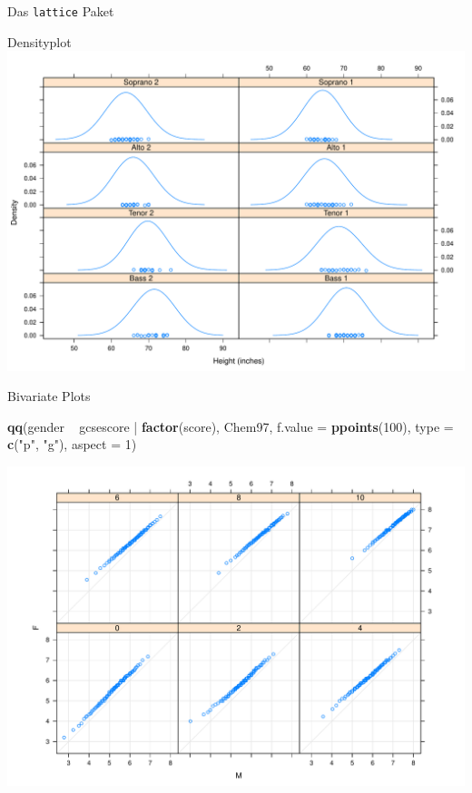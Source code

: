 \documentclass[ignorenonframetext,]{beamer}
\newenvironment{Shaded}{}{}
\newcommand{\KeywordTok}[1]{\textcolor[rgb]{0.00,0.44,0.13}{\textbf{{#1}}}}
\newcommand{\DataTypeTok}[1]{\textcolor[rgb]{0.56,0.13,0.00}{{#1}}}
\newcommand{\DecValTok}[1]{\textcolor[rgb]{0.25,0.63,0.44}{{#1}}}
\newcommand{\StringTok}[1]{\textcolor[rgb]{0.25,0.44,0.63}{{#1}}}
\newcommand{\NormalTok}[1]{{#1}}
\begin{document}
\begin{frame}[fragile]{Das \texttt{lattice} Paket}
\begin{block}{Densityplot}
\includegraphics{R_intern_files/figure-beamer/unnamed-chunk-226-1.pdf}

\end{block}

\begin{block}{Bivariate Plots}

\begin{Shaded}
\begin{Highlighting}[]
\KeywordTok{qq}\NormalTok{(gender ~}\StringTok{ }\NormalTok{gcsescore |}\StringTok{ }\KeywordTok{factor}\NormalTok{(score), Chem97,}
   \DataTypeTok{f.value =} \KeywordTok{ppoints}\NormalTok{(}\DecValTok{100}\NormalTok{), }\DataTypeTok{type =} \KeywordTok{c}\NormalTok{(}\StringTok{"p"}\NormalTok{, }\StringTok{"g"}\NormalTok{), }\DataTypeTok{aspect =} \DecValTok{1}\NormalTok{)}
\end{Highlighting}
\end{Shaded}

\includegraphics{R_intern_files/figure-beamer/unnamed-chunk-227-1.pdf}


\end{block}
\end{frame}
\end{document}
